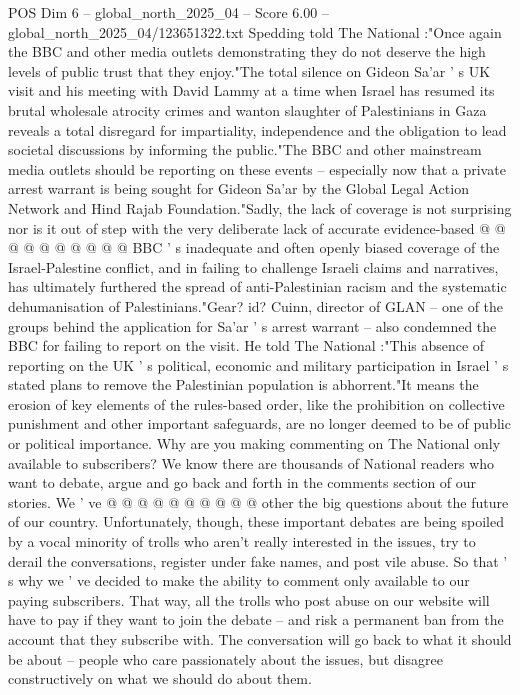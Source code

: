 \begin{textsample}{POS Dim 6 – global\_north\_2025\_04 – Score 6.00 – global\_north\_2025\_04/123651322.txt}
Spedding told The National :"Once again the BBC and other media outlets demonstrating they do not deserve the high levels of public trust that they enjoy."The total silence on Gideon Sa'ar ' s UK visit and his meeting with David Lammy at a time when Israel has resumed its brutal wholesale atrocity crimes and wanton slaughter of Palestinians in Gaza reveals a total disregard for impartiality, independence and the obligation to lead societal discussions by informing the public."The BBC and other mainstream media outlets should be reporting on these events -- especially now that a private arrest warrant is being sought for Gideon Sa'ar by the Global Legal Action Network and Hind Rajab Foundation."Sadly, the lack of coverage is not surprising nor is it out of step with the very deliberate lack of accurate evidence-based @ @ @ @ @ @ @ @ @ @ BBC ' s inadequate and often openly biased coverage of the Israel-Palestine conflict, and in failing to challenge Israeli claims and narratives, has ultimately furthered the spread of anti-Palestinian racism and the systematic dehumanisation of Palestinians."Gear? id?
Cuinn, director of GLAN -- one of the groups behind the application for Sa'ar ' s arrest warrant -- also condemned the BBC for failing to report on the visit.
He told The National :"This absence of reporting on the UK ' s political, economic and military participation in Israel ' s stated plans to remove the Palestinian population is abhorrent."It means the erosion of key elements of the rules-based order, like the prohibition on collective punishment and other important safeguards, are no longer deemed to be of public or political importance.
Why are you making commenting on The National only available to subscribers?
We know there are thousands of National readers who want to debate, argue and go back and forth in the comments section of our stories.
We ' ve @ @ @ @ @ @ @ @ @ @ other the big questions about the future of our country.
Unfortunately, though, these important debates are being spoiled by a vocal minority of trolls who aren't really interested in the issues, try to derail the conversations, register under fake names, and post vile abuse.
So that ' s why we ' ve decided to make the ability to comment only available to our paying subscribers.
That way, all the trolls who post abuse on our website will have to pay if they want to join the debate -- and risk a permanent ban from the account that they subscribe with.
The conversation will go back to what it should be about -- people who care passionately about the issues, but disagree constructively on what we should do about them.

\end{textsample}
